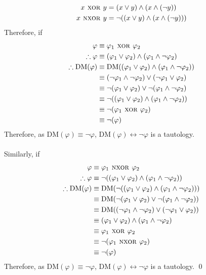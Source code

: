 \documentclass[fleqn, a4paper, 12pt, oneside]{amsart}
\theoremstyle{definition}
\theoremstyle{theorem}
\theoremstyle{remark}
\newcommand{\Xor}{{\textsc{ xor }}}
\newcommand{\Nxor}{{\textsc{ nxor }}}
\newcommand{\AND}{\wedge}
\newcommand{\OR}{\vee}
\newcommand{\NOT}{\neg}
\newcommand{\logequiv}{\leftrightarrow}
\begin{document}
\begin{solution}
	\begin{align*}
		x \Xor y &= (x \OR y) \AND (x \AND (\NOT y))\\
		x \Nxor y &= \NOT ((x \OR y) \AND (x \AND (\NOT y)))
	\end{align*}
	Therefore, if
	\begin{align*}
		\varphi &\equiv \varphi_1 \Xor \varphi_2\\
		\therefore \varphi &\equiv (\varphi_1 \OR \varphi_2) \AND (\varphi_1 \AND \NOT \varphi_2)\\
		\therefore \mathrm{DM}(\varphi) &\equiv \mathrm{DM}((\varphi_1 \OR \varphi_2) \AND (\varphi_1 \AND \NOT \varphi_2))\\
		&\equiv (\NOT \varphi_1 \AND \NOT \varphi_2) \OR (\NOT \varphi_1 \OR \varphi_2)\\
		&\equiv \NOT (\varphi_1 \OR \varphi_2) \OR \NOT (\varphi_1 \AND \NOT \varphi_2)\\
		&\equiv \NOT ((\varphi_1 \OR \varphi_2) \AND (\varphi_1 \AND \NOT \varphi_2))\\
		&\equiv \NOT (\varphi_1 \Xor \varphi_2)\\
		&\equiv \NOT (\varphi)
	\end{align*}
	Therefore, as $\mathrm{DM}(\varphi) \equiv \NOT \varphi$, $\mathrm{DM}(\varphi) \logequiv \NOT \varphi$ is a tautology.\\
	~\\
	Similarly, if
	\begin{align*}
		\varphi &\equiv \varphi_1 \Nxor \varphi_2\\
		\therefore \varphi &\equiv \NOT ((\varphi_1 \OR \varphi_2) \AND (\varphi_1 \AND \NOT \varphi_2))\\
		\therefore \mathrm{DM}(\varphi) &\equiv \mathrm{DM}(\NOT ((\varphi_1 \OR \varphi_2) \AND (\varphi_1 \AND \NOT \varphi_2)))\\
		&\equiv \mathrm{DM} (\NOT (\varphi_1 \OR \varphi_2) \OR \NOT (\varphi_1 \AND \NOT \varphi_2))\\
		&\equiv \mathrm{DM} ((\NOT \varphi_1 \AND \NOT \varphi_2) \OR (\NOT \varphi_1 \OR \varphi_2))\\
		&\equiv (\varphi_1 \OR \varphi_2) \AND (\varphi_1 \AND \NOT \varphi_2)\\
		&\equiv \varphi_1 \Xor \varphi_2\\
		&\equiv \NOT (\varphi_1 \Nxor \varphi_2)\\
		&\equiv \NOT (\varphi)
	\end{align*}
	Therefore, as $\mathrm{DM}(\varphi) \equiv \NOT \varphi$, $\mathrm{DM}(\varphi) \logequiv \NOT \varphi$ is a tautology.
	\qed
\end{solution}
\end{document}
